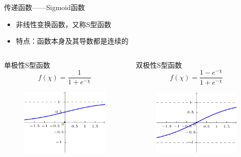 \documentclass[xcolor=svgnames]{beamer}
\begin{document}
\begin{frame}{传递函数——Sigmoid函数}
  \begin{itemize}
  \item 非线性变换函数，又称S型函数
  \item 特点：函数本身及其导数都是连续的
  \end{itemize}
  \begin{columns}[t]
    \begin{block}{单极性S型函数}
      \[
      f(\chi)=\frac1{1+e^{-\chi}}
      \]
      \centering
      \begin{figure}
        \includegraphics{fig09.pdf}
      \end{figure}
    \end{block}

    \begin{block}{双极性S型函数}
      \[
      f(\chi)=\frac{1-e^{-\chi}}{1+e^{-\chi}}
      \]
      \centering
      \begin{figure}
        \includegraphics{fig10.pdf}        
      \end{figure}
    \end{block}
  \end{columns}
\end{frame}
\end{document}

